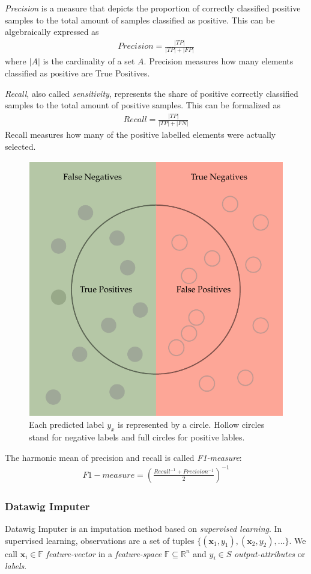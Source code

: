 \emph{Precision} is a measure that depicts the proportion of correctly classified positive samples to the total amount of samples classified as positive.\cite[p.4]{THA18} This can be algebraically expressed as
\begin{align}
    Precision = \frac{|TP|}{|TP| + |FP|}
\end{align}
where \(|A|\) is the cardinality of a set \(A\). Precision measures how many elements classified as positive are True Positives.

\emph{Recall}, also called \emph{sensitivity}, represents the
share of positive correctly classified samples to the total amount of positive samples.\cite[p.3]{THA18} This can be formalized as
\begin{align}
    Recall = \frac{|TP|}{|TP| + |FN|}
\end{align}
Recall measures how many of the positive labelled elements were actually selected.

\begin{figure}[ht]
    \centering
    \includegraphics[width=.5\textwidth]{images/precision-and-recall}
    \caption{Each predicted label \(y_{x}\) is represented by a circle. Hollow circles stand for negative labels and full circles for positive lables.  }
    \label{fig:precision-and-recall}
\end{figure}

The harmonic mean of precision and recall is called \emph{F1-measure}:
\begin{align}
F1-measure = {\left(\frac{Recall^{-1} + Precision^{-1}}{2}\right)}^{-1}
\end{align}

\subsubsection{Datawig Imputer}
Datawig Imputer is an imputation method based on \emph{supervised learning}.
In supervised learning, observations are a set of tuples \( \{\left(\mathbold{x}_1, y_1\right),\left(\mathbold{x}_2, y_2\right), \dots \} \).
We call \( \mathbold{x}_i \in \mathbb{F}\) \emph{feature-vector} in a \emph{feature-space} \( \mathbb{F} \subseteq \mathbb{R}^{n} \) and \( y_i \in S \) \emph{output-attributes} or \emph{labels}.\cite[p.19]{DUD00}

